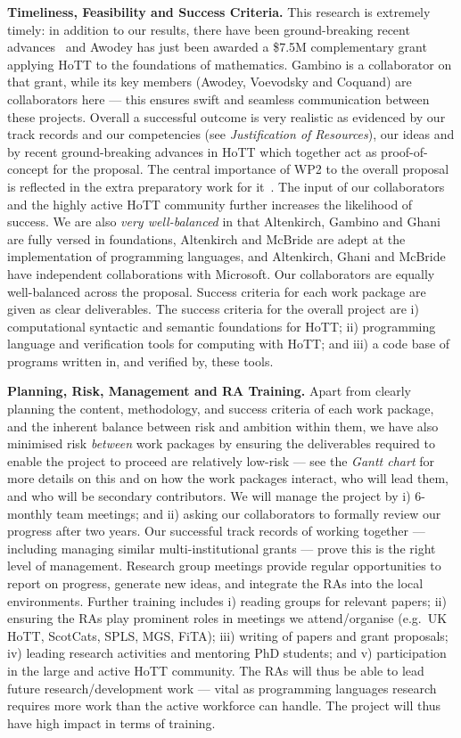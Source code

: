 \documentclass[a4paper,11pt]{article}
\newcommand{\eg}{{e.g.}\ }
\begin{document}
{\bf Timeliness, Feasibility and Success Criteria.}  This research is
extremely timely: in addition to our results, there have been
ground-breaking recent advances~\cite{ShulmanM:uniidh,BezemM:cubsmt,
  nominal} and Awodey has just been awarded a \$7.5M complementary
grant applying HoTT to the foundations of mathematics. Gambino is a
collaborator on that grant, while its key members (Awodey, Voevodsky
and Coquand) are collaborators here --- this ensures swift and
seamless communication between these projects.  Overall a successful
outcome is very realistic as evidenced by our track records and our
competencies (see {\em Justification of Resources}), our ideas and by
recent ground-breaking advances in HoTT which together act as
proof-of-concept for the proposal. The central importance of WP2 to
the overall proposal is reflected in the extra preparatory work for
it~\cite{alti-ctt,txa-ihp14}.  The input of our collaborators and the
highly active HoTT community further increases the likelihood of
success. We are also {\em very well-balanced} in that Altenkirch,
Gambino and Ghani are fully versed in foundations, Altenkirch and
McBride are adept at the implementation of programming languages, and
Altenkirch, Ghani and McBride have independent collaborations with
Microsoft. Our collaborators are equally well-balanced across the
proposal. Success criteria for each work package are given as clear
deliverables. The success criteria for the overall project are i)
computational syntactic and semantic foundations for HoTT; ii)
programming language and verification tools for computing with HoTT;
and iii) a code base of programs written in, and verified by, these
tools.


{\bf Planning, Risk, Management and RA Training.} Apart from clearly
planning the content, methodology, and success criteria of each work
package, and the inherent balance between risk and ambition within
them, we have also minimised risk {\em between} work packages by
ensuring the deliverables required to enable the project to proceed
are relatively low-risk --- see the {\em Gantt chart} for more details on
this and on how the work packages interact, who will lead them, and
who will be secondary contributors. We will manage the project by i)
6-monthly team meetings; and ii) asking our collaborators to formally
review our progress after two years.  Our successful
track records of working together --- including managing similar
multi-institutional grants --- prove this is the right level of
management. Research group meetings provide regular opportunities to
report on progress, generate new ideas, and integrate the RAs into the
local environments. Further training includes i) reading groups for
relevant papers; ii) ensuring the RAs play prominent roles in meetings
we attend/organise (\eg UK HoTT, ScotCats, SPLS, MGS, FiTA); iii)
writing of papers and grant proposals; iv) leading research activities
and mentoring PhD students; and v) participation in the large and
active HoTT community. The RAs will thus be able to lead future
research/development work --- vital as programming languages research
requires more work than the active workforce can handle. The
project will thus have high impact in terms of training.
\end{document}
